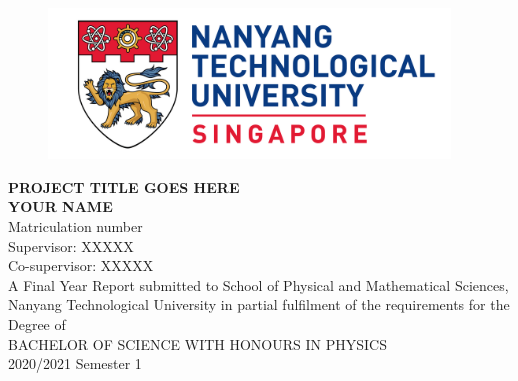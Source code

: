 \begin{titlepage}
\begin{figure}[!t]
\centering
\includegraphics[width = 4.2in]{Title/logo.png}
\caption*{}
\end{figure}

\centering
\LARGE{\textbf{PROJECT TITLE GOES HERE}}\\[1in]

\LARGE{\textbf{YOUR NAME}}\\
\normalsize{Matriculation number}\\[0.2in]

\large{Supervisor: XXXXX}\\
\large{Co-supervisor: XXXXX}\\[0.5in]

\large{A Final Year Report submitted to School of Physical and Mathematical Sciences, Nanyang Technological University in partial fulfilment of the requirements for the Degree of }\\[0.1in]

\Large{BACHELOR OF SCIENCE WITH HONOURS IN PHYSICS
}\\[1in]


\Large{2020/2021 Semester 1}
\newpage
\end{titlepage}